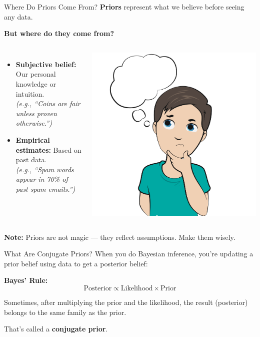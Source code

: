 \documentclass[handout,aspectratio=169]{beamer}
\begin{document}
\begin{frame}{Where Do Priors Come From?}
  \textbf{Priors} represent what we believe before seeing any data.

  \vspace{1em}
  \textbf{But where do they come from?}

    \begin{columns}
\begin{itemize}
    \item \textbf{Subjective belief:} Our personal knowledge or intuition.\\
    \textit{(e.g., “Coins are fair unless proven otherwise.”)}
    
    \item \textbf{Empirical estimates:} Based on past data.\\
    \textit{(e.g., “Spam words appear in 70\% of past spam emails.”)}
  \end{itemize}
  
    \includegraphics[width=0.6\linewidth]{figs/prior.png}
\end{columns}
  

  \vspace{1em}
  \textbf{Note:} Priors are not magic — they reflect assumptions. Make them wisely.
\end{frame}

\begin{frame}{What Are Conjugate Priors?}
  When you do Bayesian inference, you're updating a prior belief using data to get a posterior belief:

  \vspace{1em}
  \textbf{Bayes' Rule:}
  \[
    \text{Posterior} \propto \text{Likelihood} \times \text{Prior}
  \]

  \vspace{1em}
  Sometimes, after multiplying the prior and the likelihood, the result (posterior) belongs to the same family as the prior.

  \vspace{1em}
  That’s called a \textbf{conjugate prior}.
\end{frame}
\end{document}
